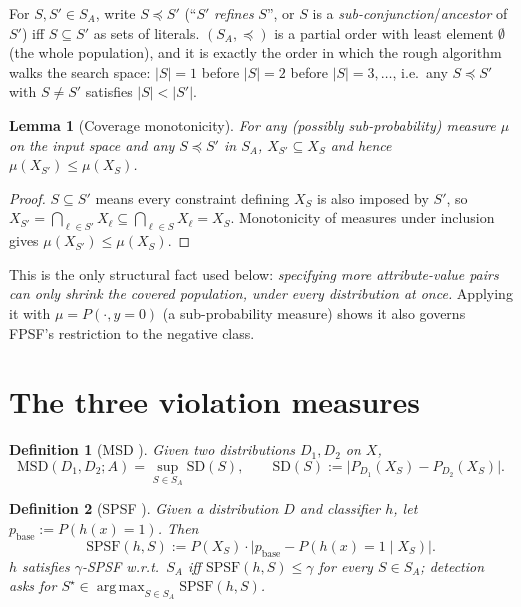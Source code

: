 \documentclass[11pt]{article}
\DeclareMathOperator{\argmax}{arg\,max}
\newtheorem{definition}{Definition}
\newtheorem{lemma}{Lemma}
\begin{document}
For $S,S'\in S_A$, write $S \preceq S'$ (``$S'$ \emph{refines} $S$'', or $S$ is a
\emph{sub-conjunction}/\emph{ancestor} of $S'$) iff $S\subseteq S'$ as sets of literals.
$(S_A,\preceq)$ is a partial order with least element $\emptyset$ (the whole
population), and it is exactly the order in which the rough algorithm walks the search
space: $|S|=1$ before $|S|=2$ before $|S|=3,\dots$, i.e.\ any $S\preceq S'$ with
$S\neq S'$ satisfies $|S|<|S'|$.

\begin{lemma}[Coverage monotonicity]\label{lem:cov}
For any (possibly sub-probability) measure $\mu$ on the input space and any
$S\preceq S'$ in $S_A$, $X_{S'}\subseteq X_S$ and hence $\mu(X_{S'})\le \mu(X_S)$.
\end{lemma}
\begin{proof}
$S\subseteq S'$ means every constraint defining $X_S$ is also imposed by $S'$, so
$X_{S'}=\bigcap_{\ell\in S'}X_\ell \subseteq \bigcap_{\ell\in S}X_\ell = X_S$.
Monotonicity of measures under inclusion gives $\mu(X_{S'})\le\mu(X_S)$.
\end{proof}

This is the only structural fact used below: \emph{specifying more attribute-value
pairs can only shrink the covered population, under every distribution at once.}
Applying it with $\mu=P(\cdot,y=0)$ (a sub-probability measure) shows it also
governs FPSF's restriction to the negative class.

\section{The three violation measures}

\begin{definition}[MSD \cite{msd}]
Given two distributions $D_1,D_2$ on $X$,
\[
\mathrm{MSD}(D_1,D_2;A)=\sup_{S\in S_A}\mathrm{SD}(S),\qquad
\mathrm{SD}(S):=\bigl|P_{D_1}(X_S)-P_{D_2}(X_S)\bigr|.
\]
\end{definition}

\begin{definition}[SPSF \cite{kearns18}]
Given a distribution $D$ and classifier $h$, let $p_{\mathrm{base}}:=P(h(x)=1)$. Then
\[
\mathrm{SPSF}(h,S):=P(X_S)\cdot\bigl|p_{\mathrm{base}}-P(h(x)=1\mid X_S)\bigr|.
\]
$h$ satisfies $\gamma$-SPSF w.r.t.\ $S_A$ iff $\mathrm{SPSF}(h,S)\le\gamma$ for every
$S\in S_A$; detection asks for $S^\star\in\argmax_{S\in S_A}\mathrm{SPSF}(h,S)$.
\end{definition}
\end{document}
